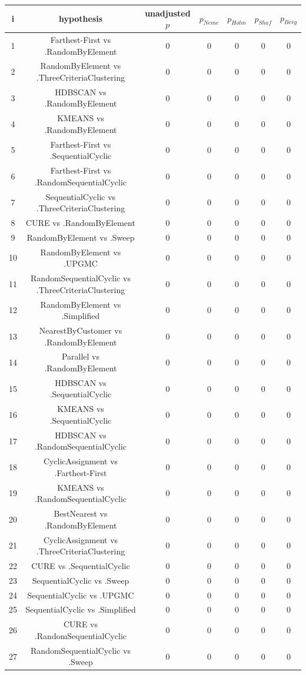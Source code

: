 \documentclass[a4paper,10pt]{article}
\begin{document}
\begin{landscape}
\begin{table}[!htp]
\centering\scriptsize
\begin{tabular}{ccccccc}
i&hypothesis&unadjusted $p$&$p_{Neme}$&$p_{Holm}$&$p_{Shaf}$&$p_{Berg}$\\
\hline1&Farthest-First vs .RandomByElement&0&0&0&0&0\\
2&RandomByElement vs .ThreeCriteriaClustering&0&0&0&0&0\\
3&HDBSCAN vs .RandomByElement&0&0&0&0&0\\
4&KMEANS vs .RandomByElement&0&0&0&0&0\\
5&Farthest-First vs .SequentialCyclic&0&0&0&0&0\\
6&Farthest-First vs .RandomSequentialCyclic&0&0&0&0&0\\
7&SequentialCyclic vs .ThreeCriteriaClustering&0&0&0&0&0\\
8&CURE vs .RandomByElement&0&0&0&0&0\\
9&RandomByElement vs .Sweep&0&0&0&0&0\\
10&RandomByElement vs .UPGMC&0&0&0&0&0\\
11&RandomSequentialCyclic vs .ThreeCriteriaClustering&0&0&0&0&0\\
12&RandomByElement vs .Simplified&0&0&0&0&0\\
13&NearestByCustomer vs .RandomByElement&0&0&0&0&0\\
14&Parallel vs .RandomByElement&0&0&0&0&0\\
15&HDBSCAN vs .SequentialCyclic&0&0&0&0&0\\
16&KMEANS vs .SequentialCyclic&0&0&0&0&0\\
17&HDBSCAN vs .RandomSequentialCyclic&0&0&0&0&0\\
18&CyclicAssignment vs .Farthest-First&0&0&0&0&0\\
19&KMEANS vs .RandomSequentialCyclic&0&0&0&0&0\\
20&BestNearest vs .RandomByElement&0&0&0&0&0\\
21&CyclicAssignment vs .ThreeCriteriaClustering&0&0&0&0&0\\
22&CURE vs .SequentialCyclic&0&0&0&0&0\\
23&SequentialCyclic vs .Sweep&0&0&0&0&0\\
24&SequentialCyclic vs .UPGMC&0&0&0&0&0\\
25&SequentialCyclic vs .Simplified&0&0&0&0&0\\
26&CURE vs .RandomSequentialCyclic&0&0&0&0&0\\
27&RandomSequentialCyclic vs .Sweep&0&0&0&0&0\\

\end{tabular}
\end{table}
\end{landscape}
\end{document}
